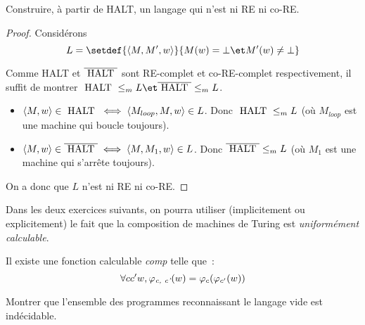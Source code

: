 \begin{exercice}
	Construire, à partir de HALT, un langage qui n'est ni RE ni co-RE.
\end{exercice}

\begin{proof}
	Considérons
	$$ L = \setdef {\encode {M,M',w}} {M(w) = \bot \et M'(w) \neq \bot} $$

	Comme HALT et $\overline {\halt}$ sont RE-complet et co-RE-complet respectivement, il suffit de montrer $\halt \leqm L \et \overline{\halt} \leqm L$.

	\begin{itemize}
		\item $\encode {M,w} \in \halt \iff \encode {M_{loop}, M, w} \in L$. Donc $\halt \leqm L$ (où $M_{loop}$ est une machine qui boucle toujours).
		\item $\encode {M,w} \in \overline{\halt} \iff \encode {M, M_1, w} \in L$. Donc $\overline{\halt} \leqm L$ (où $M_1$ est une machine qui s'arrête toujours).
	\end{itemize}

	On a donc que $L$ n'est ni RE ni co-RE.
\end{proof}

Dans les deux exercices suivants, on pourra utiliser (implicitement ou explicitement) le fait que la composition de machines de Turing est \emph{uniformément calculable}.
\begin{lemma}\label{lem:comp}
	Il existe une fonction calculable \emph{comp} telle que :
	$$\forall c c' w, \phi_{\emph{c, c'}}(w) = \phi_c(\phi_{c'}(w))$$
\end{lemma}



\begin{exercice}
	Montrer que l'ensemble des programmes reconnaissant le langage vide est indécidable.
\end{exercice}

